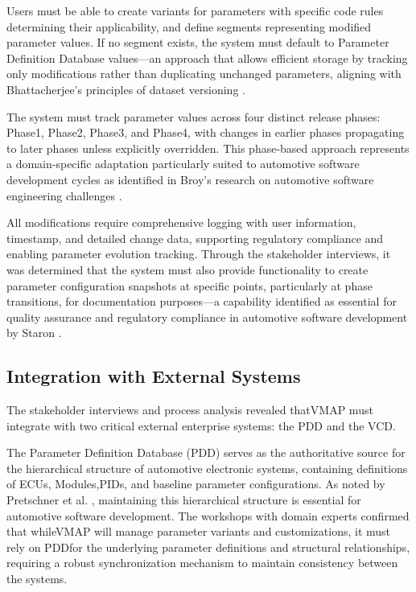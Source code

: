 Users must be able to create variants for parameters with specific code rules determining their applicability, and define segments representing modified parameter values. If no segment exists, the system must default to Parameter Definition Database values—an approach that allows efficient storage by tracking only modifications rather than duplicating unchanged parameters, aligning with Bhattacherjee's principles of dataset versioning \cite{bhattacherjee2015principles}.

The system must track parameter values across four distinct release phases: Phase1, Phase2, Phase3, and Phase4, with changes in earlier phases propagating to later phases unless explicitly overridden. This phase-based approach represents a domain-specific adaptation particularly suited to automotive software development cycles as identified in Broy's research on automotive software engineering challenges \cite{broy2006challenges}.

All modifications require comprehensive logging with user information, timestamp, and detailed change data, supporting regulatory compliance and enabling parameter evolution tracking. Through the stakeholder interviews, it was determined that the system must also provide functionality to create parameter configuration snapshots at specific points, particularly at phase transitions, for documentation purposes—a capability identified as essential for quality assurance and regulatory compliance in automotive software development by Staron \cite{staron2021automotive}.

\subsection{Integration with External Systems}
\label{subsec:integration-external-systems}

The stakeholder interviews and process analysis revealed that\ac{VMAP} must integrate with two critical external enterprise systems: the \ac{PDD} and the \ac{VCD}.

The Parameter Definition Database (PDD) serves as the authoritative source for the hierarchical structure of automotive electronic systems, containing definitions of \acp{ECU}, Modules,\acp{PID}, and baseline parameter configurations. As noted by Pretschner et al. \cite{pretschner2007software}, maintaining this hierarchical structure is essential for automotive software development. The workshops with domain experts confirmed that while\ac{VMAP} will manage parameter variants and customizations, it must rely on \ac{PDD}for the underlying parameter definitions and structural relationships, requiring a robust synchronization mechanism to maintain consistency between the systems.

